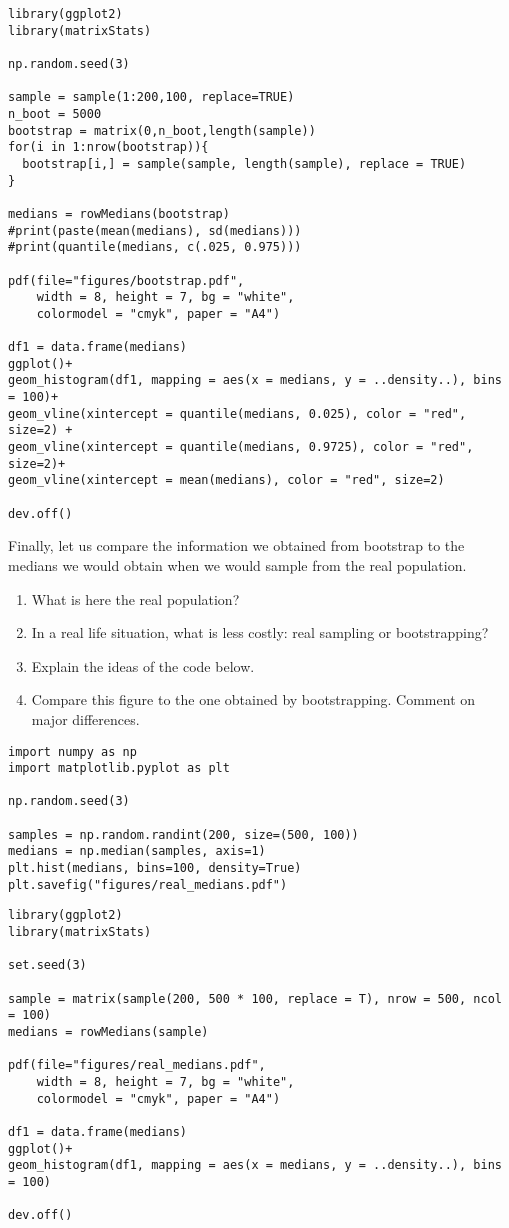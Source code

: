 \begin{verbatim}
library(ggplot2)
library(matrixStats)

np.random.seed(3)

sample = sample(1:200,100, replace=TRUE)
n_boot = 5000
bootstrap = matrix(0,n_boot,length(sample))
for(i in 1:nrow(bootstrap)){
  bootstrap[i,] = sample(sample, length(sample), replace = TRUE)
}

medians = rowMedians(bootstrap)
#print(paste(mean(medians), sd(medians)))
#print(quantile(medians, c(.025, 0.975)))

pdf(file="figures/bootstrap.pdf",
    width = 8, height = 7, bg = "white",
    colormodel = "cmyk", paper = "A4")

df1 = data.frame(medians)
ggplot()+
geom_histogram(df1, mapping = aes(x = medians, y = ..density..), bins = 100)+
geom_vline(xintercept = quantile(medians, 0.025), color = "red", size=2) +
geom_vline(xintercept = quantile(medians, 0.9725), color = "red", size=2)+
geom_vline(xintercept = mean(medians), color = "red", size=2)

dev.off()
\end{verbatim}

\begin{exercise}
Finally, let us compare the information we obtained from bootstrap to the medians we would obtain when we would sample from the real population.
\begin{enumerate}
\item What is here the real population?
\item In a real life situation, what is less costly: real sampling or bootstrapping?
\item Explain the ideas of the code below.
\item Compare this figure to the one obtained by bootstrapping. Comment on major differences.
\end{enumerate}
\begin{verbatim}
import numpy as np
import matplotlib.pyplot as plt

np.random.seed(3)

samples = np.random.randint(200, size=(500, 100))
medians = np.median(samples, axis=1)
plt.hist(medians, bins=100, density=True)
plt.savefig("figures/real_medians.pdf")
\end{verbatim}

\begin{verbatim}
library(ggplot2)
library(matrixStats)

set.seed(3)

sample = matrix(sample(200, 500 * 100, replace = T), nrow = 500, ncol = 100)
medians = rowMedians(sample)

pdf(file="figures/real_medians.pdf",
    width = 8, height = 7, bg = "white",
    colormodel = "cmyk", paper = "A4")

df1 = data.frame(medians)
ggplot()+
geom_histogram(df1, mapping = aes(x = medians, y = ..density..), bins = 100)

dev.off()
\end{verbatim}
\end{exercise}





